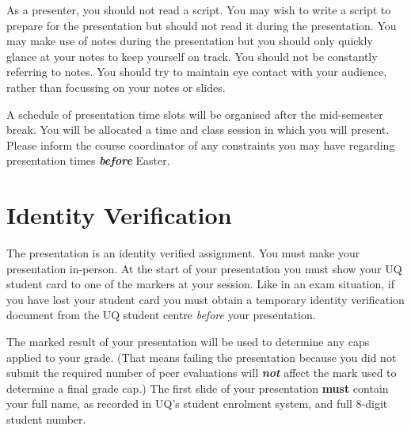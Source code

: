 \documentclass{csse4400}
\begin{document}
As a presenter, you should not read a script.
You may wish to write a script to prepare for the presentation but should not read it during the presentation.
You may make use of notes during the presentation but you should only quickly glance at your notes to keep yourself on track.
You should not be constantly referring to notes.
You should try to maintain eye contact with your audience, rather than focussing on your notes or slides.

A schedule of presentation time slots will be organised after the mid-semester break.
You will be allocated a time and class session in which you will present.
Please inform the course coordinator of any constraints you may have regarding presentation times \textbf{\textit{before}} Easter.


\section{Identity Verification}
The presentation is an identity verified assignment.
You must make your presentation in-person.
At the start of your presentation you must show your UQ student card to one of the markers at your session.
Like in an exam situation, if you have lost your student card
you must obtain a temporary identity verification document from the UQ student centre \emph{before} your presentation.

The marked result of your presentation will be used to determine any caps applied to your grade.
(That means failing the presentation because you did not submit the required number of peer evaluations
will \textbf{\textit{not}} affect the mark used to determine a final grade cap.)
The first slide of your presentation \textbf{must} contain your full name, as recorded in UQ's student enrolment system,
and full 8-digit student number.
\end{document}
